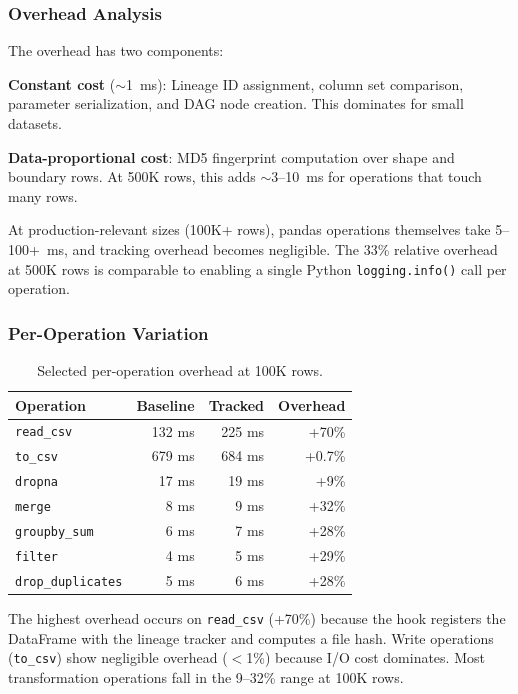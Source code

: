 \documentclass[10pt,twocolumn]{article}
\begin{document}
\subsubsection{Overhead Analysis}

The overhead has two components:

\textbf{Constant cost} ($\sim$1~ms): Lineage ID assignment, column set comparison, parameter serialization, and DAG node creation. This dominates for small datasets.

\textbf{Data-proportional cost}: MD5 fingerprint computation over shape and boundary rows. At 500K rows, this adds $\sim$3--10~ms for operations that touch many rows.

At production-relevant sizes (100K+ rows), pandas operations themselves take 5--100+~ms, and tracking overhead becomes negligible. The 33\% relative overhead at 500K rows is comparable to enabling a single Python \texttt{logging.info()} call per operation.

\subsubsection{Per-Operation Variation}

\begin{table}[t]
\centering
\caption{Selected per-operation overhead at 100K rows.}
\label{tab:per_operation}
\small
\begin{tabular}{@{}lrrr@{}}
\toprule
\textbf{Operation} & \textbf{Baseline} & \textbf{Tracked} & \textbf{Overhead} \\
\midrule
\texttt{read\_csv} & 132 ms & 225 ms & +70\% \\
\texttt{to\_csv} & 679 ms & 684 ms & +0.7\% \\
\texttt{dropna} & 17 ms & 19 ms & +9\% \\
\texttt{merge} & 8 ms & 9 ms & +32\% \\
\texttt{groupby\_sum} & 6 ms & 7 ms & +28\% \\
\texttt{filter} & 4 ms & 5 ms & +29\% \\
\texttt{drop\_duplicates} & 5 ms & 6 ms & +28\% \\
\bottomrule
\end{tabular}
\end{table}

The highest overhead occurs on \texttt{read\_csv} (+70\%) because the hook registers the DataFrame with the lineage tracker and computes a file hash. Write operations (\texttt{to\_csv}) show negligible overhead ($<$1\%) because I/O cost dominates. Most transformation operations fall in the 9--32\% range at 100K rows.
\end{document}
